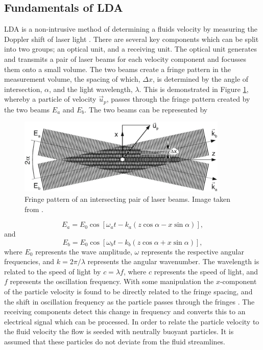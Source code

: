 \documentclass[12pt,oneside,a4paper]{article}
\begin{document}
\subsection{Fundamentals of LDA}
LDA is a non-intrusive method of determining a fluids velocity by measuring the Doppler shift of laser light \citep{zhang2010lda}. There are several key components which can be split into two groups; an optical unit, and a receiving unit. The optical unit generates and transmits a pair of laser beams for each velocity component and focusses them onto a small volume. %
 The two beams create a fringe pattern in the measurement volume, the spacing of which, $\Delta x$, is determined by the angle of intersection, $\alpha$, and the light wavelength, $\lambda$. This is demonstrated in Figure \ref{figure:experiments:fringePattern}, whereby a particle of velocity $\overrightarrow{u}_p$, passes through the fringe pattern created by the two beams $E_a$ and $E_b$. The two beams can be represented by 
%
\begin{figure}[!t]
\centering
\includegraphics[width=10cm]{images/LDA_theoryImages/fringePattern.png}
\caption{Fringe pattern of an intersecting pair of laser beams. Image taken from \cite{zhang2010lda}.}
\label{figure:experiments:fringePattern}
\end{figure}
%
\begin{equation}
E_a = E_0 \cos {\left[ \omega_a t - k_a (z \cos{\alpha} - x \sin{\alpha} ) \right]},
\end{equation}
and
\begin{equation}
E_b = E_0 \cos{ \left[ \omega_b t - k_b (z \cos{\alpha} + x \sin{\alpha} ) \right]},
\end{equation}
where $E_0$ represents the wave amplitude, $\omega$ represents the respective angular frequencies, and $k = 2 \pi / \lambda$ represents the angular wavenumber. The wavelength is related to the speed of light by $c = \lambda f$, where $c$ represents the speed of light, and $f$ represents the oscillation frequency. With some manipulation the $x$-component of the particle velocity is found to be directly related to the fringe spacing, and the shift in oscillation frequency as the particle passes through the fringes \citep{zhang2010lda}. The receiving components detect this change in frequency and converts this to an electrical signal which can be processed. In order to relate the particle velocity to the fluid velocity the flow is seeded with neutrally buoyant particles. It is assumed that these particles do not deviate from the fluid streamlines. 
\end{document}
